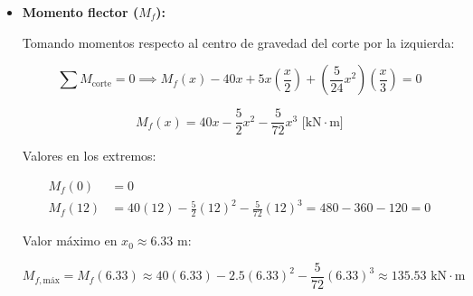 \begin{itemize}
\begin{equation}
          \end{equation}



    \item \textbf{Momento flector ($M_f$):}

          Tomando momentos respecto al centro de gravedad del corte por la izquierda:

          \begin{equation}

              \sum M_{\text{corte}} = 0 \implies M_f(x) - 40x + 5x\left(\frac{x}{2}\right) + \left(\frac{5}{24}x^2\right)\left(\frac{x}{3}\right) = 0

          \end{equation}

          \begin{equation}

              \boxed{M_f(x) = 40x - \frac{5}{2}x^2 - \frac{5}{72}x^3\text{ [kN}\cdot\text{m]}}

          \end{equation}

          Valores en los extremos:

          \begin{align*}

              M_f(0)  & = 0                                                                     \\

              M_f(12) & = 40(12) - \frac{5}{2}(12)^2 - \frac{5}{72}(12)^3 = 480 - 360 - 120 = 0

          \end{align*}

          Valor máximo en $x_0 \approx 6.33\text{ m}$:

          \begin{equation}

              M_{f,\text{máx}} = M_f(6.33) \approx 40(6.33) - 2.5(6.33)^2 - \frac{5}{72}(6.33)^3 \approx \boxed{135.53\text{ kN}\cdot\text{m}}

          \end{equation}

\end{itemize}



